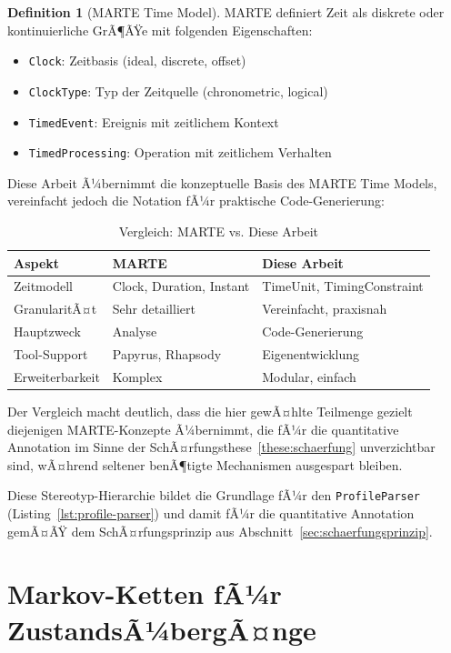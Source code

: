 ﻿\documentclass[a4paper,12pt]{report}
\theoremstyle{definition}
\newtheorem{definition}{Definition}[section]
\begin{document}
\begin{definition}[MARTE Time Model]
	MARTE definiert Zeit als diskrete oder kontinuierliche GrÃ¶ÃŸe mit folgenden Eigenschaften:
	\begin{itemize}
		\item[-] \texttt{Clock}: Zeitbasis (ideal, discrete, offset)
		\item[-] \texttt{ClockType}: Typ der Zeitquelle (chronometric, logical)
		\item[-] \texttt{TimedEvent}: Ereignis mit zeitlichem Kontext
		\item[-] \texttt{TimedProcessing}: Operation mit zeitlichem Verhalten
	\end{itemize}
\end{definition}

Diese Arbeit Ã¼bernimmt die konzeptuelle Basis des MARTE Time Models, vereinfacht jedoch die Notation fÃ¼r praktische Code-Generierung:

\begin{table}[H]
	\centering
	\begin{tabular}{@{}lll@{}}
		\toprule
		\textbf{Aspekt} & \textbf{MARTE} & \textbf{Diese Arbeit} \\
		\midrule
		Zeitmodell & Clock, Duration, Instant & TimeUnit, TimingConstraint \\
		GranularitÃ¤t & Sehr detailliert & Vereinfacht, praxisnah \\
		Hauptzweck & Analyse & Code-Generierung \\
		Tool-Support & Papyrus, Rhapsody & Eigenentwicklung \\
		Erweiterbarkeit & Komplex & Modular, einfach \\
		\bottomrule
	\end{tabular}
	\caption{Vergleich: MARTE vs. Diese Arbeit}
	\label{tab:marte-comparison}
\end{table}

Der Vergleich macht deutlich, dass die hier gewÃ¤hlte Teilmenge gezielt diejenigen MARTE-Konzepte Ã¼bernimmt, die fÃ¼r die quantitative Annotation im Sinne der SchÃ¤rfungsthese~\ref{these:schaerfung} unverzichtbar sind, wÃ¤hrend seltener benÃ¶tigte Mechanismen ausgespart bleiben.

Diese Stereotyp-Hierarchie bildet die Grundlage fÃ¼r den \texttt{ProfileParser} (Listing~\ref{lst:profile-parser}) und damit fÃ¼r die quantitative Annotation gemÃ¤ÃŸ dem SchÃ¤rfungsprinzip aus Abschnitt~\ref{sec:schaerfungsprinzip}.

\section{Markov-Ketten fÃ¼r ZustandsÃ¼bergÃ¤nge}
\label{sec:markov-grundlagen}
\end{document}
